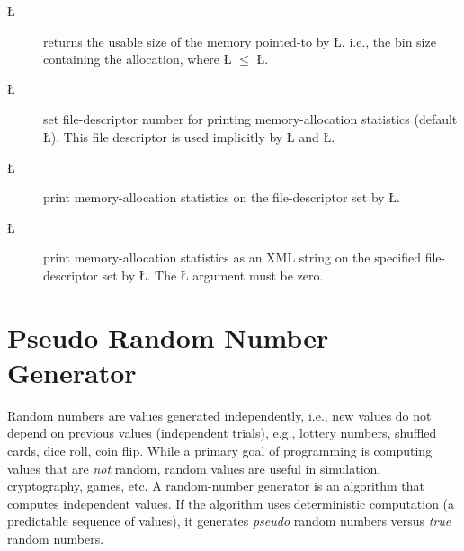 \documentclass[openright,twoside]{report}
\begin{document}
\begin{description}
\item[\LGinlinetrue\LGbegin\lgrinde\L{}\endlgrinde\LGend{}] returns the usable size of the memory pointed-to by \LGinlinetrue\LGbegin\lgrinde\L{}\endlgrinde\LGend{}, i.e., the bin size containing the allocation, where \LGinlinetrue\LGbegin\lgrinde\L{}\endlgrinde\LGend{} $\le$ \LGinlinetrue\LGbegin\lgrinde\L{}\endlgrinde\LGend{}.
\item[\LGinlinetrue\LGbegin\lgrinde\L{}\endlgrinde\LGend{}] set file-descriptor number for printing memory-allocation statistics (default \LGinlinetrue\LGbegin\lgrinde\L{}\endlgrinde\LGend{}).
This file descriptor is used implicitly by \LGinlinetrue\LGbegin\lgrinde\L{}\endlgrinde\LGend{} and \LGinlinetrue\LGbegin\lgrinde\L{}\endlgrinde\LGend{}.
\item[\LGinlinetrue\LGbegin\lgrinde\L{}\endlgrinde\LGend{}] print memory-allocation statistics on the file-descriptor set by \LGinlinetrue\LGbegin\lgrinde\L{}\endlgrinde\LGend{}.
\item[\LGinlinetrue\LGbegin\lgrinde\L{}\endlgrinde\LGend{}] print memory-allocation statistics as an XML string on the specified file-descriptor set by \LGinlinetrue\LGbegin\lgrinde\L{}\endlgrinde\LGend{}.
The \LGinlinetrue\LGbegin\lgrinde\L{}\endlgrinde\LGend{} argument must be zero.
\end{description}


\chapter{Pseudo Random Number Generator}
\label{s:PRNG}

Random numbers are values generated independently, i.e., new values do not depend on previous values (independent trials), e.g., lottery numbers, shuffled cards, dice roll, coin flip.
While a primary goal of programming is computing values that are \emph{not} random, random values are useful in simulation, cryptography, games, etc.
A random-number generator is an algorithm that computes independent values.
If the algorithm uses deterministic computation (a predictable sequence of values), it generates \emph{pseudo} random numbers versus \emph{true} random numbers.
\end{document}
